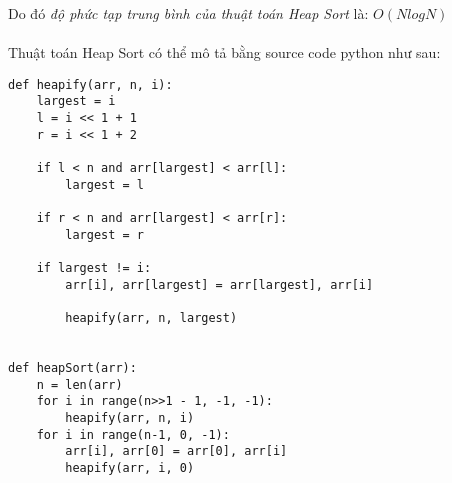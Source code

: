 \documentclass{article}
\begin{document}
\begin{multicols}{2}
\begin{center}
\end{center}
Do đó \textit{độ phức tạp trung bình của thuật toán Heap Sort} là: $O(NlogN)$\\
\\
Thuật toán Heap Sort có thể mô tả bằng source code python như sau:
\begin{verbatim}
def heapify(arr, n, i):
    largest = i 
    l = i << 1 + 1   
    r = i << 1 + 2   
 
    if l < n and arr[largest] < arr[l]:
        largest = l
 
    if r < n and arr[largest] < arr[r]:
        largest = r
 
    if largest != i:
        arr[i], arr[largest] = arr[largest], arr[i] 
 
        heapify(arr, n, largest)
 
 
def heapSort(arr):
    n = len(arr) 
    for i in range(n>>1 - 1, -1, -1):
        heapify(arr, n, i) 
    for i in range(n-1, 0, -1):
        arr[i], arr[0] = arr[0], arr[i]   
        heapify(arr, i, 0)
 
\end{verbatim}

\end{multicols}
\end{document}
